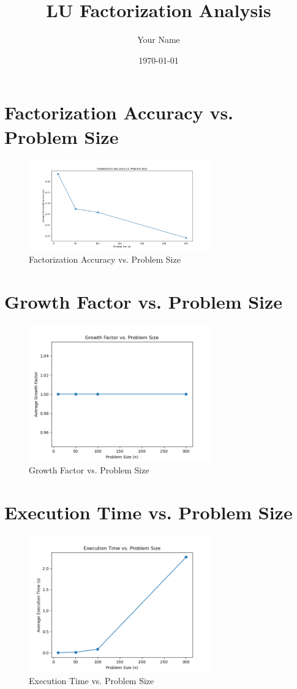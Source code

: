 \documentclass{article}
\begin{document}
\title{LU Factorization Analysis}
\author{Your Name}
\date{\today}
\maketitle

\section{Factorization Accuracy vs. Problem Size}
\begin{figure}[H]
    \centering
    \includegraphics[width=0.7\textwidth]{acc_over_n.png}
    \caption{Factorization Accuracy vs. Problem Size}
\end{figure}

\section{Growth Factor vs. Problem Size}
\begin{figure}[H]
    \centering
    \includegraphics[width=0.7\textwidth]{grow_fac.png}
    \caption{Growth Factor vs. Problem Size}
\end{figure}

\section{Execution Time vs. Problem Size}
\begin{figure}[H]
    \centering
    \includegraphics[width=0.7\textwidth]{ex_time.png}
    \caption{Execution Time vs. Problem Size}
\end{figure}
\end{document}
